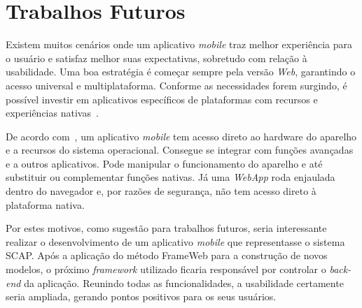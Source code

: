 \section{Trabalhos Futuros}
\label{sec-conclusoes-trabalhos-futuros}

Existem muitos cenários onde um aplicativo \textit{mobile} traz melhor experiência para o usuário e satisfaz melhor suas expectativas, sobretudo com relação à usabilidade. Uma boa estratégia é começar sempre pela versão \textit{Web}, garantindo o acesso universal e multiplataforma. Conforme as necessidades forem surgindo, é possível investir em aplicativos específicos de plataformas com recursos e experiências nativas~\cite{lopes:awm14}.

De acordo com~, um aplicativo \textit{mobile} tem acesso direto ao hardware do aparelho e a recursos do sistema operacional. Consegue se integrar com funções avançadas e a outros aplicativos. Pode manipular o funcionamento do aparelho e até substituir ou complementar funções nativas. Já uma \textit{WebApp} roda enjaulada dentro do navegador e, por razões de segurança, não tem acesso direto à plataforma nativa.

Por estes motivos, como sugestão para trabalhos futuros, seria interessante realizar o desenvolvimento de um aplicativo \textit{mobile} que representasse o sistema SCAP. Após a aplicação do método FrameWeb para a construção de novos modelos, o próximo \textit{framework} utilizado ficaria responsável por controlar o \textit{back-end} da aplicação. Reunindo todas as funcionalidades, a usabilidade certamente seria ampliada, gerando pontos positivos para os seus usuários.   
